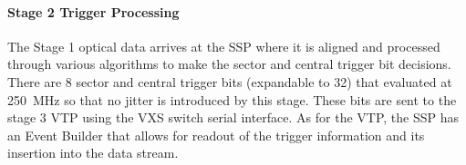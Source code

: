 \paragraph{Stage 2 Trigger Processing}
The Stage 1 optical data arrives at the SSP where it is aligned and processed through various algorithms to make the sector and central trigger bit decisions. There are 8 sector and central trigger bits (expandable to 32) that evaluated at 250~MHz so that no jitter is introduced by this stage. These bits are sent to the stage 3 VTP using the VXS switch serial interface. As for the VTP, the SSP has an Event Builder that allows for readout of the trigger information and its insertion into the data stream.
